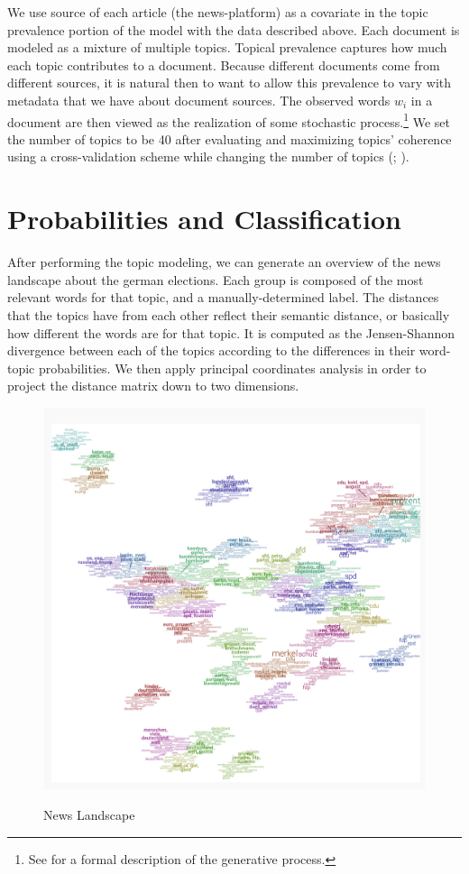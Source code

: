 \documentclass[12pt,a4paper,notitlepage]{article}
\begin{document}
We use source of each article (the news-platform) as a covariate in the topic prevalence portion of the model with the data described above. Each document is modeled as a mixture of multiple topics. Topical prevalence captures how much each topic contributes to a document. Because different documents come from different sources, it is natural then to want to allow this prevalence to vary with metadata that we have about document sources. The observed words $w_i$ in a document are then viewed as the realization of some stochastic process.\footnote{See \citet{roberts_model_2016} for a formal description of the generative process.} We set the number of topics to be 40 after evaluating and maximizing topics' coherence using a cross-validation scheme while changing the number of topics (\citet{airoldi_reconceptualizing_2010}; \citet{roberts_model_2016}).

\section{Probabilities and Classification}\label{ch_results}


After performing the topic modeling, we can generate an overview of the news landscape about the german elections. Each group is composed of the most relevant words for that topic, and a manually-determined label. The distances that the topics have from each other reflect their semantic distance, or basically how different the words are for that topic. It is computed as the Jensen-Shannon divergence between each of the topics according to the differences in their word-topic probabilities. We then apply principal coordinates analysis in order to project the distance matrix down to two dimensions.

\begin{figure}[H]
\centering
	\caption{News Landscape}
	\includegraphics[width=\textwidth]{../figs/news-landscape-map.png}	
	\label{fig_landscape}
\end{figure}
\end{document}
